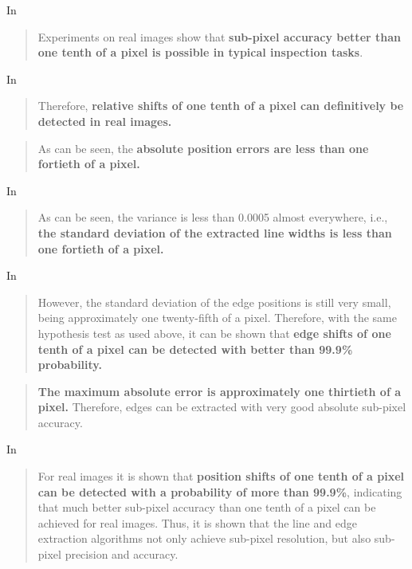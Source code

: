 \documentclass[a4paper,12pt]{article}
\begin{document}
In \cite[p.1]{Steger}
\begin{quotation}
Experiments on real images
show that \textbf{sub-pixel accuracy better than one tenth of a pixel is possible in typical inspection
tasks}.
\end{quotation}

In \cite[Section 5.3.2
Sub-Pixel Accuracy of Line Position and Width, p.164]{Steger}
\begin{quotation}
Therefore, \textbf{relative shifts of one tenth of a pixel can definitively be detected
in real images.}
\end{quotation}
\begin{quotation}
As can be seen, the \textbf{absolute position errors are less than
one fortieth of a pixel.}
\end{quotation}

In \cite[Section 5.3.2
Sub-Pixel Accuracy of Line Position and Width, p.165]{Steger}
\begin{quotation}
As can be seen, the variance is less than 0.0005 almost everywhere, i.e., \textbf{the standard
deviation of the extracted line widths is less than one fortieth of a pixel.}
\end{quotation}

In \cite[5.3.3 Sub-Pixel Accuracy of Edge Position, p.166]{Steger}
\begin{quotation}
However, the standard deviation of the edge positions is still very
small, being approximately one twenty-fifth of a pixel. Therefore, with the same hypothesis
test as used above, it can be shown that \textbf{edge shifts of one tenth of a pixel can be detected with
better than 99.9\% probability.}
\end{quotation}

\begin{quotation}
\textbf{The maximum absolute error is approximately one thirtieth of a pixel.} Therefore, edges can be
extracted with very good absolute sub-pixel accuracy.
\end{quotation}

In \cite[Chapter 6 Conclusions, p.168]{Steger}
\begin{quotation}
For real images it is shown that \textbf{position shifts of one tenth of a pixel can be
detected with a probability of more than 99.9\%}, indicating that much better sub-pixel accuracy
than one tenth of a pixel can be achieved for real images. Thus, it is shown that the line and
edge extraction algorithms not only achieve sub-pixel resolution, but also sub-pixel precision
and accuracy.
\end{quotation}








\printbibliography
\end{document}
